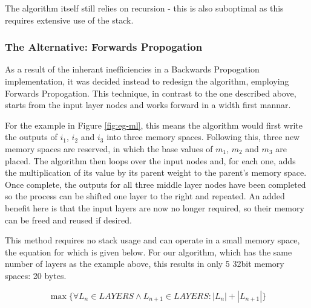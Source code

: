 The algorithm itself still relies on recursion - this is also suboptimal as this requires extensive use of the stack.

\subsubsection{The Alternative: Forwards Propogation}

As a result of the inherant inefficiencies in a Backwards Propogation implementation, it was decided instead to redesign the algorithm, employing Forwards Propogation. This technique, in contrast to the one described above, starts from the input layer nodes and works forward in a width first mannar.

For the example in Figure \ref{fig:eg-ml}, this means the algorithm would first write the outputs of $i_1$, $i_2$ and $i_3$ into three memory spaces. Following this, three new memory spaces are reserved, in which the base values of $m_1$, $m_2$ and $m_3$ are placed. The algorithm then loops over the input nodes and, for each one, adds the multiplication of its value by its parent weight to the parent's memory space. Once complete, the outputs for all three middle layer nodes have been completed so the process can be shifted one layer to the right and repeated. An added benefit here is that the input layers are now no longer required, so their memory can be freed and reused if desired.

This method requires no stack usage and can operate in a small memory space, the equation for which is given below. For our algorithm, which has the same number of layers as the example above, this results in only 5 32bit memory spaces: 20 bytes.

\begin{equation}
\label{eq:algo-size}
\max\{\forall L_n \in LAYERS \wedge L_{n+1} \in LAYERS : |L_n|+|L_{n+1}|\}
\end{equation}